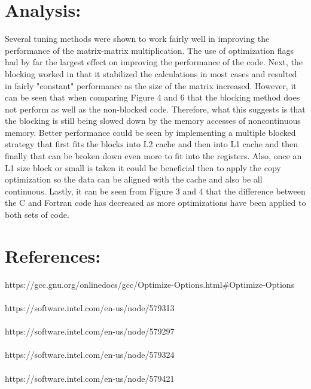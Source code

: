 \documentclass{article}
\begin{document}
\section*{Analysis:}

Several tuning methods were shown to work fairly well in improving the performance of the matrix-matrix multiplication. The use of optimization flags had by far the largest effect on improving the performance of the code. Next, the blocking worked in that it stabilized the calculations in most cases and resulted in fairly "constant" performance as the size of the matrix increased. However, it can be seen that when comparing Figure 4 and 6 that the blocking method does not perform as well as the non-blocked code. Therefore, what this suggests is that the blocking is still being slowed down by the memory accesses of noncontinuous memory. Better performance could be seen by implementing a multiple blocked strategy that first fits the blocks into L2 cache and then into L1 cache and then finally that can be broken down even more to fit into the registers. Also, once an L1 size block or small is taken it could be beneficial then to apply the copy optimization so the data can be aligned with the cache and also be all continuous. Lastly, it can be seen from Figure 3 and 4 that the difference between the C and Fortran code has decreased as more optimizations have been applied to both sets of code.

\section*{References:}

\noindent [1]  https://gcc.gnu.org/onlinedocs/gcc/Optimize-Options.html\#Optimize-Options \\  \\
\noindent [2] https://software.intel.com/en-us/node/579313 \\ \\
\noindent [3] https://software.intel.com/en-us/node/579297 \\ \\
\noindent [4] https://software.intel.com/en-us/node/579324 \\ \\
\noindent [5] https://software.intel.com/en-us/node/579421 \\ \\
\end{document}
